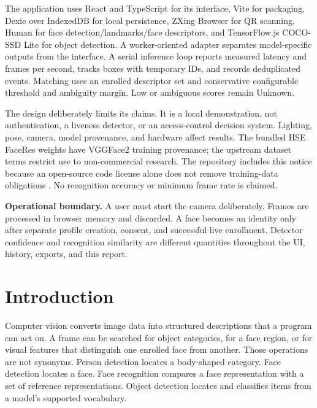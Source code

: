 \documentclass[11pt,oneside,openany]{report}
\begin{document}
The application uses React and TypeScript for its interface, Vite for packaging, Dexie over IndexedDB for local persistence, ZXing Browser for QR scanning, Human for face detection/landmarks/face descriptors, and TensorFlow.js COCO-SSD Lite for object detection. A worker-oriented adapter separates model-specific outputs from the interface. A serial inference loop reports measured latency and frames per second, tracks boxes with temporary IDs, and records deduplicated events. Matching uses an enrolled descriptor set and conservative configurable threshold and ambiguity margin. Low or ambiguous scores remain Unknown.

The design deliberately limits its claims. It is a local demonstration, not authentication, a liveness detector, or an access-control decision system. Lighting, pose, camera, model provenance, and hardware affect results. The bundled HSE FaceRes weights have VGGFace2 training provenance; the upstream dataset terms restrict use to non-commercial research. The repository includes this notice because an open-source code license alone does not remove training-data obligations \cite{vggTerms}. No recognition accuracy or minimum frame rate is claimed.

\begin{principlebox}
\textbf{Operational boundary.} A user must start the camera deliberately. Frames are processed in browser memory and discarded. A face becomes an identity only after separate profile creation, consent, and successful live enrollment. Detector confidence and recognition similarity are different quantities throughout the UI, history, exports, and this report.
\end{principlebox}

\tableofcontents
\listoffigures
\listoftables
\clearpage
{}

\chapter{Introduction}
Computer vision converts image data into structured descriptions that a program can act on. A frame can be searched for object categories, for a face region, or for visual features that distinguish one enrolled face from another. Those operations are not synonyms. Person detection locates a body-shaped category. Face detection locates a face. Face recognition compares a face representation with a set of reference representations. Object detection locates and classifies items from a model's supported vocabulary.
\end{document}

